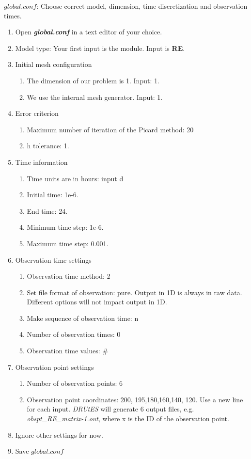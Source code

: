 \documentclass[
10pt, %
a4paper, %
oneside, %
headinclude,footinclude, %
BCOR5mm, %
]{scrartcl}
\begin{document}
$global.conf$: Choose correct model, dimension, time discretization and observation times.
\begin{enumerate}
\item Open \textbf{\emph{global.conf}} in a text editor of your choice. 
\item Model type: Your first input is the module. Input is \textbf{RE}.
\item Initial mesh configuration \begin{enumerate}
\item The dimension of our problem is 1. Input: 1.
\item We use the internal mesh generator. Input: 1. 
\end{enumerate}
\item Error criterion \begin{enumerate} 
\item Maximum number of iteration of the Picard method: 20 
\item h tolerance: 1.
\end{enumerate}
\item Time information 
\begin{enumerate} 
\item Time units are in hours: input d
\item Initial time: 1e-6.
\item End time: 24.
\item Minimum time step: 1e-6.
\item Maximum time step: 0.001.
\end{enumerate}
\item Observation time settings \begin{enumerate}
\item Observation time method: 2
\item Set file format of observation: pure. Output in 1D is always in raw data. Different options will not impact output in 1D.
\item Make sequence of observation time: n
\item Number of observation times: 0
\item Observation time values: \#
\end{enumerate}
\item Observation point settings \begin{enumerate}
\item Number of observation points: 6 
\item Observation point coordinates: 200, 195,180,160,140, 120. Use a new line for each input. \textit{DRUtES} will generate 6 output files, e.g. \textit{obspt\_RE\_matrix-1.out}, where x is the ID of the observation point. 
\end{enumerate}
\item Ignore other settings for now. 
\item Save $global.conf$
\end{enumerate}
\end{document}
